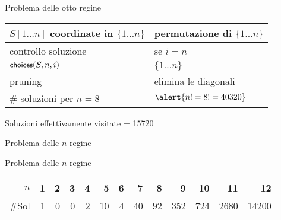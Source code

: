 \begin{frame}{Problema delle otto regine}

\vspace{-9pt}

\medskip
\begin{tabular}{|P{4cm}|P{7.1cm}|}
\hline
$S[1 \ldots n]$ coordinate in $\{ 1 \ldots n \}$	&	permutazione di $\{ 1 \ldots n \}$ \\\hline
controllo soluzione	& se $i = n$ \\\hline
$\textsf{{\small choices}}(S, n, i)$	&	$\{ 1 \ldots n \}$ \\\hline
pruning	&	elimina le diagonali \\\hline
\# soluzioni per $n=8$ 	&		$\alert{n! = 8! = 40320}$\\\hline 
\end{tabular}

\begin{myboxtitle}[Commenti]
\BI
\item Soluzioni effettivamente visitate = 15720
\EI
\end{myboxtitle}

\end{frame}

\begin{frame}{Problema delle $n$ regine}

\vspace{-9pt}
\begin{Procedure}
\caption[A]{(\INTEGER $n$, $\INTEGER[\,]\ S$, \INTEGER $i$)}
\end{Procedure}
\end{frame}

\begin{frame}{Problema delle $n$ regine}

\begin{tabular}{|r|r|r|r|r|r|r|r|r|r|r|r|r|}
\hline
$n$ & 1 & 2 & 3 & 4 & 5 & 6 & 7 & 8 & 9 & 10 & 11 & 12 \\\hline
\#Sol & 1 & 0 & 0 & 2 & 10 & 4 & 40 & 92 & 352 & 724 & 2680	& 14200\\\hline
\end{tabular}



\end{frame}

